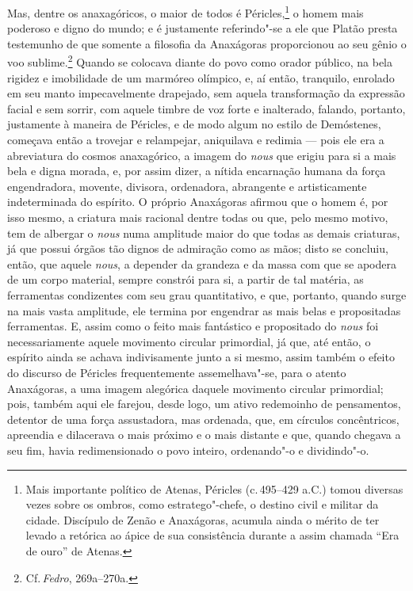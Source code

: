 Mas, dentre os anaxagóricos, o maior de todos é Péricles,\footnote{ Mais
importante político de Atenas, Péricles (c.\,495--429 a.C.) tomou diversas
vezes sobre os ombros, como estratego"-chefe, o destino civil e militar da
cidade. Discípulo de Zenão e Anaxágoras, acumula ainda o mérito de ter levado
a retórica ao ápice de sua consistência durante a assim chamada ``Era de
ouro'' de Atenas.} o homem mais poderoso e digno do mundo; e é justamente
referindo"-se a ele que Platão presta testemunho de que somente a filosofia
da Anaxágoras proporcionou ao seu gênio o voo sublime.\footnote{ Cf.\,\textit{Fedro}, 
269a--270a.} Quando se colocava diante do povo como orador público,
na bela rigidez e imobilidade de um marmóreo olímpico, e, aí então,
tranquilo, enrolado em seu manto impecavelmente drapejado, sem aquela
transformação da expressão facial e sem sorrir, com aquele timbre de voz
forte e inalterado, falando, portanto, justamente à maneira de Péricles, e de
modo algum no estilo de Demóstenes, começava então a trovejar e relampejar,
aniquilava e redimia --- pois ele era a abreviatura do cosmos anaxagórico, a
imagem do \textit{nous} que erigiu para si a mais bela e digna morada, e, por
assim dizer, a nítida encarnação humana da força engendradora, movente,
divisora, ordenadora, abrangente e artisticamente indeterminada do espírito.
O próprio Anaxágoras afirmou que o homem é, por isso mesmo, a criatura mais
racional dentre todas ou que, pelo mesmo motivo, tem de albergar o
\textit{nous} numa amplitude maior do que todas as demais criaturas, já que
 possui órgãos tão dignos de admiração como as mãos; disto se concluiu,
 então, que aquele \textit{nous}, a depender da grandeza e da massa com que
 se apodera de um corpo material, sempre constrói para si, a partir de tal
 matéria, as ferramentas condizentes com seu grau quantitativo, e que,
 portanto, quando surge na mais vasta amplitude, ele termina por engendrar as
 mais belas e propositadas ferramentas. E, assim como o feito mais fantástico
 e propositado do \textit{nous} foi necessariamente aquele movimento circular
 primordial, já que, até então, o espírito ainda se achava indivisamente
 junto a si mesmo, assim também o efeito do discurso de Péricles
 frequentemente assemelhava"-se, para o atento Anaxágoras, a uma imagem
 alegórica daquele movimento circular primordial; pois, também aqui ele
 farejou, desde logo, um ativo redemoinho de pensamentos, detentor de uma
 força assustadora, mas ordenada, que, em círculos concêntricos, apreendia e
 dilacerava o mais próximo e o mais distante e que, quando chegava a seu fim,
 havia redimensionado o povo inteiro, ordenando"-o e dividindo"-o.

